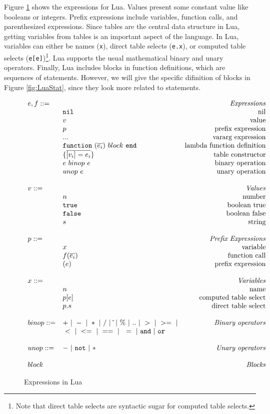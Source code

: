 Figure \ref{fig:LuaExp} shows the expressions for Lua.
Values present some constant value like booleans or integers.
Prefix expressions include variables, function calls, and parenthesized expressions.
Since tables are the central data structure in Lua,
getting variables from tables is an important aspect of the language.
In Lua, variables can either be names ({\tt x}), direct table selects ({\tt e.x}), or computed table selects ({\tt e[e]})\footnote{
Note that direct table selects are syntactic sugar for computed table selects.
}.
Lua supports the usual mathematical binary and unary operators.
Finally, Lua includes blocks in function definitions, which are sequences of statements. However, we will give the specific difinition of blocks in Figure \ref{fig:LuaStat}, since they look more related to statements.



\begin{figure}
\caption{Expressions in Lua}
\label{fig:LuaExp}
\[
\begin{array}{llr}
  \mydefhead{e,f ::=\qquad\qquad\qquad\qquad}{Expressions}
  \mydefcase{\tt nil}{nil}
  \mydefcase{v}{value}
  \mydefcase{p}{prefix expression}
  \mydefcase{\tt ...}{vararg expression}
  \mydefcase{\functiondef e {block}}{lambda function definition}
  \mydefcase{\{\overline{[v_i] = e_i}\}}{table constructor}
  \mydefcase{e ~binop~ e}{binary operation}
  \mydefcase{unop~ e}{unary operation}
  \\
  \mydefhead{v ::=\qquad\qquad\qquad\qquad}{Values}
  \mydefcase{n}{number}
  \mydefcase{\tt true}{boolean true}
  \mydefcase{\tt false}{boolean false}
  \mydefcase{s}{string}
  \\
  \mydefhead{p ::=\qquad\qquad\qquad\qquad}{Prefix Expressions}
  \mydefcase{x}{variable}
  \mydefcase{f(\overline{e_i})}{function call}
  \mydefcase{(e)}{prefix expression}
  
  \\
  \mydefhead{x ::=\qquad\qquad\qquad\qquad}{Variables}
  \mydefcase{n}{name}
  \mydefcase{p[e]}{computed table select}
  \mydefcase{p.s}{direct table select}
  \\
  binop ::= & + ~|~ - ~|~ * ~|~ / ~|~ \hat{} ~|~ \% ~|~ .. ~|~ > ~|~ >= ~|& \mbox{\emph{Binary operators}}\\
  \quad & ~ < ~|~ <= ~|~ == ~|~ ~= ~|~ {\tt and} ~|~ {\tt or} &  \\
  \\
  unop ::= & - ~|~ {\tt not} ~|~ *  & \mbox{\emph{Unary operators}} \\
  \\
  \mydefhead{block \qquad\qquad\qquad\qquad}{Blocks}
\end{array}
\]
\end{figure}



